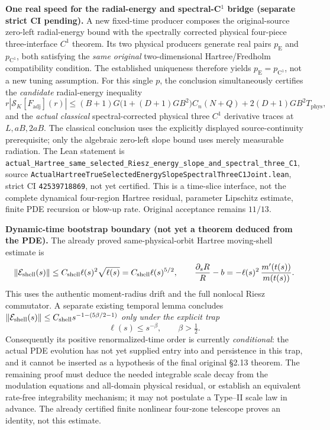 \documentclass[11pt]{amsart}
\begin{document}
\medskip
\noindent\textbf{One real speed for the radial-energy and spectral-C\(^1\) bridge
(separate strict CI pending).}
A new fixed-time producer composes the original-source
zero-left radial-energy bound with the spectrally corrected physical
four-piece three-interface \(C^1\) theorem. Its two physical
producers generate real pairs \(p_{\mathrm E}\) and
\(p_{\mathrm{C^1}}\), both satisfying the \emph{same original}
two-dimensional Hartree/Fredholm compatibility condition.
The established uniqueness therefore yields
\(p_{\mathrm E}=p_{\mathrm{C^1}}\), not a new tuning assumption.
For this single \(p\), the conclusion simultaneously certifies
the \emph{candidate} radial-energy inequality
\[
 r|\mathcal S_K[F_{\mathrm{adj}}](r)|
 \le (B+1)G\bigl(1+(D+1)GB^2\bigr)C_n(N+Q)
   +2(D+1)GB^2T_{\mathrm{phys}},
\]
and the \emph{actual classical} spectral-corrected physical
three \(C^1\) derivative traces at \(L,aB,2aB\).
The classical conclusion uses the explicitly displayed
source-continuity prerequisite; only the algebraic zero-left
slope bound uses merely measurable radiation.
The Lean statement is
\texttt{actual\_Hartree\_same\_selected\_Riesz\_energy\_slope\_and\_spectral\_three\_C1},
source \texttt{ActualHartreeTrueSelectedEnergySlopeSpectralThreeC1Joint.lean},
strict CI \texttt{42539718869}, not yet certified.
This is a time-slice interface, not the complete dynamical
four-region Hartree residual, parameter Lipschitz estimate,
finite PDE recursion or blow-up rate. Original acceptance remains \(11/13\).



\medskip
\noindent\textbf{Dynamic-time bootstrap boundary (not yet a theorem
deduced from the PDE).}
The already proved same-physical-orbit Hartree moving-shell estimate is
\[
 \|\mathcal E_{\rm shell}(s)\|
 \le C_{\rm shell}\ell(s)^2\sqrt{\ell(s)}
 =C_{\rm shell}\ell(s)^{5/2},
 \qquad
 \frac{\partial_sR}{R}-b
 =-\ell(s)^2\,\frac{m'(t(s))}{m(t(s))}.
\]
This uses the authentic moment-radius drift and the full nonlocal
Riesz commutator. A separate existing temporal lemma concludes
\(
 \|\mathcal E_{\rm shell}(s)\|
 \le C_{\rm shell}s^{-1-(5\beta/2-1)}
\)
\emph{only under the explicit trap}
\[
 \ell(s)\le s^{-\beta},\qquad \beta>\tfrac12.
\]
Consequently its positive renormalized-time order is currently
\emph{conditional}: the actual PDE evolution has not yet supplied
entry into and persistence in this trap, and it cannot be inserted
as a hypothesis of the final original \S2.13 theorem. The remaining
proof must deduce the needed integrable scale decay from the modulation
equations and all-domain physical residual, or establish an
equivalent rate-free integrability mechanism; it may not postulate
a Type--II scale law in advance. The already certified finite
nonlinear four-zone telescope proves an identity, not this estimate.
\end{document}
